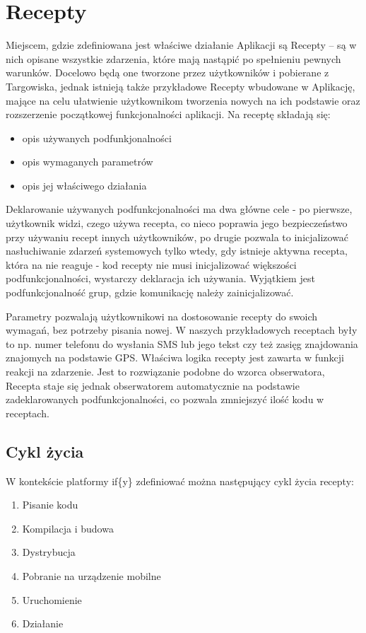 \documentclass[11pt,a4paper,polish,thesis]{dcsbook}
\begin{document}
\section{Recepty}
Miejscem, gdzie zdefiniowana jest właściwe działanie Aplikacji są Recepty -- są w nich opisane wszystkie zdarzenia, które mają nastąpić po spełnieniu pewnych warunków. Docelowo będą one tworzone przez użytkowników i pobierane z Targowiska, jednak istnieją także przykładowe Recepty wbudowane w Aplikację, mające na celu ułatwienie użytkownikom tworzenia nowych na ich podstawie oraz rozszerzenie początkowej funkcjonalności aplikacji. 
Na receptę składają się:
\begin{itemize}
\item  opis używanych podfunkjonalności
\item  opis wymaganych parametrów
\item  opis jej właściwego działania
\end{itemize}
Deklarowanie używanych podfunkcjonalności ma dwa główne cele - po pierwsze, użytkownik widzi, czego używa recepta, co nieco poprawia jego bezpieczeństwo przy używaniu recept innych użytkowników, po drugie pozwala to inicjalizować nasłuchiwanie zdarzeń systemowych tylko wtedy, gdy istnieje aktywna recepta, która na nie reaguje - kod recepty nie musi inicjalizować większości podfunkcjonalności, wystarczy deklaracja ich używania. Wyjątkiem jest podfunkcjonalność grup, gdzie komunikację należy zainicjalizować.

Parametry pozwalają użytkownikowi na dostosowanie recepty do swoich wymagań, bez potrzeby pisania nowej. W naszych przykładowych receptach były to np. numer telefonu do wysłania SMS lub jego tekst czy też zasięg znajdowania znajomych na podstawie GPS.
Właściwa logika recepty jest zawarta w funkcji reakcji na zdarzenie. Jest to rozwiązanie podobne do wzorca obserwatora, Recepta staje się jednak obserwatorem automatycznie na podstawie zadeklarowanych podfunkcjonalności, co pozwala zmniejszyć ilość kodu w receptach.

\subsection{Cykl życia}
W kontekście platformy if\{y\} zdefiniować można następujący cykl życia recepty:
\begin{enumerate}
\item Pisanie kodu
\item Kompilacja i budowa
\item Dystrybucja
\item Pobranie na urządzenie mobilne
\item Uruchomienie
\item Działanie
\end{enumerate}
\end{document}
